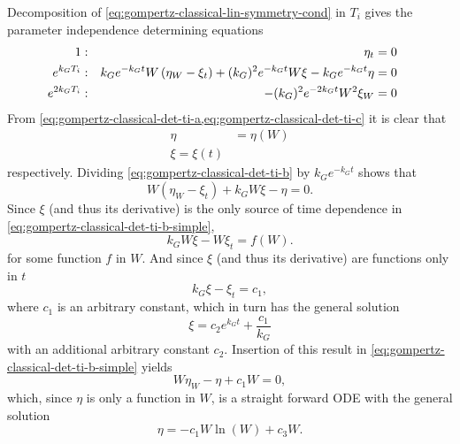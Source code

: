 Decomposition of \cref{eq:gompertz-classical-lin-symmetry-cond} in \(T_i\) gives the parameter independence determining equations
\begin{subequations}
  \begin{flalign}
    1 & : & \eta_t &= 0 && \FlLabel{eq:gompertz-classical-det-ti-a}\\
    e^{k_G T_i} & : & k_G e^{-k_G t} W \left(\eta_W - \xi_t\right) + (k_G)^2 e^{-k_G t} W \xi - k_G e^{-k_G t} \eta &= 0 && \FlLabel{eq:gompertz-classical-det-ti-b}\\
    e^{2 k_G T_i} & : & -(k_G)^2 e^{-2 k_G t} W^2 \xi_W &= 0 && \FlLabel{eq:gompertz-classical-det-ti-c}
  \end{flalign}
\end{subequations}
From \cref{eq:gompertz-classical-det-ti-a,eq:gompertz-classical-det-ti-c} it is clear that
\begin{align}
  \eta &= \eta(W) \\
  \xi = \xi(t)
\end{align}
respectively.
Dividing \cref{eq:gompertz-classical-det-ti-b} by \(k_G e^{-k_G t}\) shows that
\begin{equation}\label{eq:gompertz-classical-det-ti-b-simple}
  W \left(\eta_W - \xi_t\right) + k_G W \xi - \eta = 0.
\end{equation}
Since \(\xi\) (and thus its derivative) is the only source of time dependence in \cref{eq:gompertz-classical-det-ti-b-simple},
\begin{equation}
  k_G W \xi - W \xi_t = f(W).
\end{equation}
for some function \(f\) in \(W\).
And since \(\xi\) (and thus its derivative) are functions only in \(t\)
\begin{equation}
  k_G \xi - \xi_t = c_1,
\end{equation}
where \(c_1\) is an arbitrary constant, which in turn has the general solution
\begin{equation}
  \xi = c_2 e^{k_G t} + \frac{c_1}{k_G}
\end{equation}
with an additional arbitrary constant \(c_2\).
Insertion of this result in \cref{eq:gompertz-classical-det-ti-b-simple} yields
\begin{equation}
  W \eta_W - \eta + c_1 W = 0,
\end{equation}
which, since \(\eta\) is only a function in \(W\), is a straight forward ODE with the general solution
\begin{equation}
  \eta = -c_1 W \ln(W) + c_3 W.
\end{equation}
